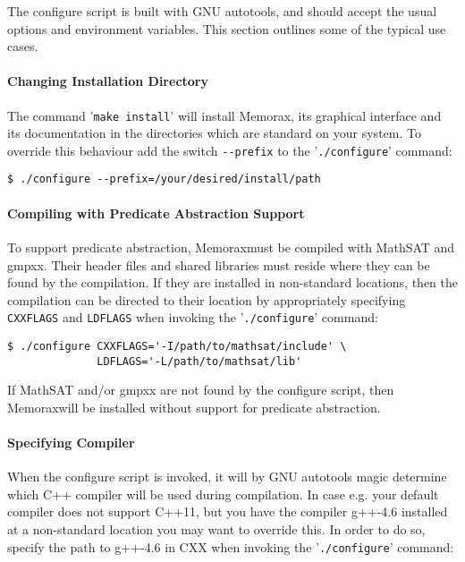\documentclass[a4paper]{article}
\newcommand{\tool}{Memorax} %
\begin{document}
   The configure script is built with GNU autotools, and should accept
   the usual options and environment variables. This section outlines
   some of the typical use cases.

\paragraph{Changing Installation Directory}

   The command '\verb+make install+' will install \tool, its graphical
   interface and its documentation in the directories which are
   standard on your system. To override this behaviour add the switch
   \verb+--prefix+ to the '\verb+./configure+' command:

\begin{verbatim}
$ ./configure --prefix=/your/desired/install/path
\end{verbatim}

\paragraph{Compiling with Predicate Abstraction Support}

   To support predicate abstraction, \tool must be compiled with
   MathSAT and gmpxx. Their header files and shared libraries must
   reside where they can be found by the compilation. If they are
   installed in non-standard locations, then the compilation can be
   directed to their location by appropriately specifying
   \verb+CXXFLAGS+ and \verb+LDFLAGS+ when invoking the
   '\verb+./configure+' command:

\begin{verbatim}
$ ./configure CXXFLAGS='-I/path/to/mathsat/include' \
              LDFLAGS='-L/path/to/mathsat/lib'
\end{verbatim}

   If MathSAT and/or gmpxx are not found by the configure script, then
   \tool will be installed without support for predicate abstraction.

\paragraph{Specifying Compiler}

   When the configure script is invoked, it will by GNU autotools
   magic determine which C++ compiler will be used during
   compilation. In case e.g. your default compiler does not support
   C++11, but you have the compiler g++-4.6 installed at a
   non-standard location you may want to override this. In order to do
   so, specify the path to g++-4.6 in CXX when invoking the
   '\verb+./configure+' command:
\end{document}

